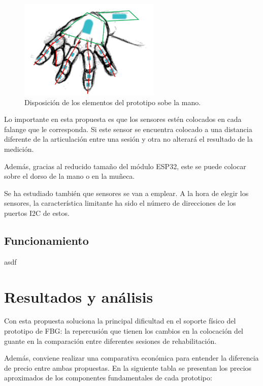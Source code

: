 \begin{figure}[H]
	\centering
	\includegraphics[width=0.6\textwidth]{./img/IMU2}
	\caption{Disposición de los elementos del prototipo sobe la mano. } 
	\label{fig:disposicionIMU}
\end{figure} 

Lo importante en esta propuesta es que los sensores estén colocados en cada falange que le corresponda. Si este sensor se encuentra colocado a una distancia diferente de la articulación entre una sesión y otra no alterará el resultado de la medición.

Además, gracias al reducido tamaño del módulo ESP32, este se puede colocar sobre el dorso de la mano o en la muñeca. 

Se ha estudiado también que sensores se van a emplear. A la hora de elegir los sensores, la característica limitante ha sido el número de direcciones de los puertos I2C de estos.  


\subsection{Funcionamiento}
\label{sec:funcionamiento4}
asdf



\section{Resultados y análisis}
\label{sec:resultados4}

	Con esta propuesta soluciona la principal dificultad en el soporte físico del prototipo de FBG: la repercusión que tienen los cambios en la colocación del guante en la comparación entre diferentes sesiones de rehabilitación. 
	
	Además, conviene realizar una comparativa económica para entender la diferencia de precio entre ambas propuestas. En la siguiente tabla se presentan los precios aproximados de los componentes fundamentales de cada prototipo:
	
	
	

